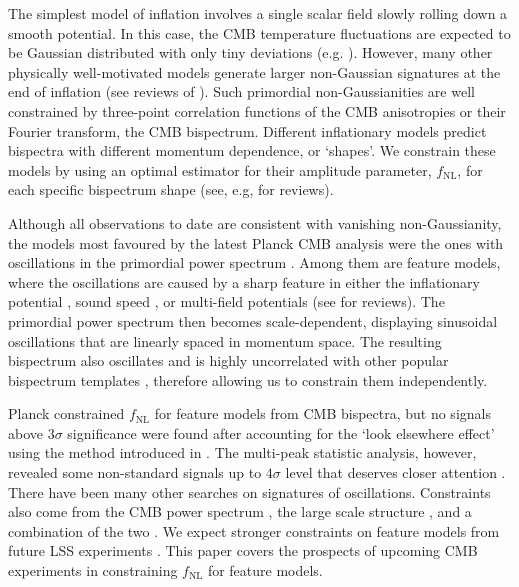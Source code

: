 The simplest model of inflation involves a single scalar field slowly rolling down a smooth potential. In this case, the CMB temperature fluctuations are expected to be Gaussian distributed with only tiny deviations (e.g. \cite{Maldacena2013}). However, many other physically well-motivated models generate larger non-Gaussian signatures at the end of inflation (see reviews of \cite{Chen2010review}). Such primordial non-Gaussianities are well constrained by three-point correlation functions of the CMB anisotropies or their Fourier transform, the CMB bispectrum. Different inflationary models predict bispectra with different momentum dependence, or `shapes'. We constrain these models by using an optimal estimator for their amplitude parameter,  $f_\text{NL}$,  for each specific bispectrum shape (see, e.g, \cite{Komatsu2010,Liguori2010} for reviews).

Although all observations to date are consistent with vanishing non-Gaussianity, the models most favoured by the latest Planck CMB analysis were the ones with oscillations in the primordial power spectrum \cite{PlanckCollaboration2015}. Among them are feature models, where the oscillations are caused by a sharp feature in either the inflationary potential \cite{starobinsky1992,Adams2001,Chen2007,Adshead2012,Hazra2014,Dvorkin2010}, sound speed \cite{Miranda2012,Bartolo2013}, or multi-field potentials \cite{Achucarro2011} (see \cite{Chen2010review,Chluba2015} for reviews). The primordial power spectrum then becomes scale-dependent, displaying sinusoidal oscillations that are linearly spaced in momentum space. The resulting bispectrum also oscillates and is highly uncorrelated with other popular bispectrum templates \cite{Meerburg2009signatures}, therefore allowing us to constrain them independently.

Planck constrained $f_\text{NL}$ for feature models from CMB bispectra, but no signals above $3\sigma$ significance were found after accounting for the `look elsewhere effect' using the method introduced in \cite{Fergusson2015a}. The multi-peak statistic analysis, however, revealed some non-standard signals up to $4\sigma$ level that deserves closer attention \cite{PlanckCollaboration2015}. There have been many other searches on signatures of oscillations. Constraints also come from the CMB power spectrum \cite{Martin2004,Benetti2011,Meerburg2012,Meerburg2014a,Meerburg2014,Fergusson2015b}, the large scale structure \cite{Chantavat2011,Ballardini2016}, and a combination of the two \cite{Hu2015,Benetti2016}. We expect stronger constraints on feature models from future LSS experiments \cite{Chen2016}. This paper covers the prospects of upcoming CMB experiments in constraining $f_\text{NL}$ for feature models.

